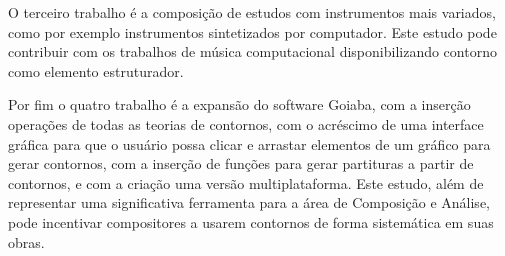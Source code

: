 O terceiro trabalho é a composição de estudos com instrumentos mais
variados, como por exemplo instrumentos sintetizados por
computador. Este estudo pode contribuir com os trabalhos de música
computacional disponibilizando contorno como elemento estruturador.


Por fim o quatro trabalho é a expansão do software Goiaba, com a
inserção operações de todas as teorias de contornos, com o acréscimo
de uma interface gráfica para que o usuário possa clicar e arrastar
elementos de um gráfico para gerar contornos, com a inserção de
funções para gerar partituras a partir de contornos, e com a criação
uma versão multiplataforma. Este estudo, além de representar uma
significativa ferramenta para a área de Composição e Análise, pode
incentivar compositores a usarem contornos de forma sistemática em
suas obras.

